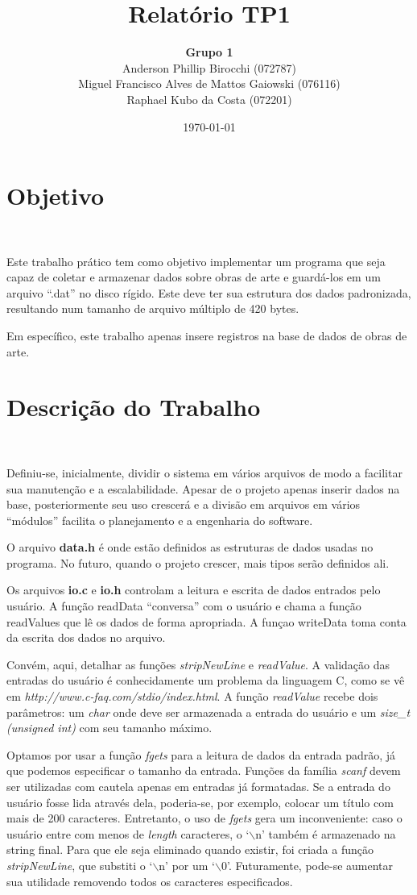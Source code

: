 \documentclass{article}
\title{\textbf{Relatório TP1}}
\author{\textbf{Grupo 1} \\
  Anderson Phillip Birocchi (072787) \\
  Miguel Francisco Alves de Mattos Gaiowski (076116) \\
  Raphael Kubo da Costa (072201)}
\date{\today}
\begin{document}
\maketitle

\section*{Objetivo}\

Este trabalho prático tem como objetivo implementar um programa que seja capaz de coletar e armazenar dados sobre obras de arte e guardá-los em um arquivo ``.dat'' no disco rígido. Este deve ter sua estrutura dos dados padronizada, resultando num tamanho de arquivo múltiplo de 420 bytes.

Em específico, este trabalho apenas insere registros na base de dados de obras de arte.

\section*{Descrição do Trabalho}\

Definiu-se, inicialmente, dividir o sistema em vários arquivos de modo a facilitar sua manutenção e a escalabilidade. Apesar de o projeto apenas inserir dados na base, posteriormente seu uso crescerá e a divisão em arquivos em vários ``módulos'' facilita o planejamento e a engenharia do software.

O arquivo \textbf{data.h} é onde estão definidos as estruturas de dados usadas no programa. No futuro, quando o projeto crescer, mais tipos serão definidos ali.

Os arquivos \textbf{io.c} e \textbf{io.h} controlam a leitura e escrita de dados entrados pelo usuário. A função readData ``conversa'' com o usuário e chama a função readValues que lê os dados de forma apropriada. A funçao writeData toma conta da escrita dos dados no arquivo.

Convém, aqui, detalhar as funções \textit{stripNewLine} e \textit{readValue}. A validação das entradas do usuário é conhecidamente um problema da linguagem C, como se vê em \textit{http://www.c-faq.com/stdio/index.html}. A função \textit{readValue} recebe dois parâmetros: um \textit{char} onde deve ser armazenada a entrada do usuário e um \textit{size\_t (unsigned int)} com seu tamanho máximo.

Optamos por usar a função \textit{fgets} para a leitura de dados da entrada padrão, já que podemos especificar o tamanho da entrada. Funções da família \textit{scanf} devem ser utilizadas com cautela apenas em entradas já formatadas. Se a entrada do usuário fosse lida através dela, poderia-se, por exemplo, colocar um título com mais de 200 caracteres. Entretanto, o uso de \textit{fgets} gera um inconveniente: caso o usuário entre com menos de \textit{length} caracteres, o `$\backslash$n' também é armazenado na string final. Para que ele seja eliminado quando existir, foi criada a função \textit{stripNewLine}, que substiti o `$\backslash$n' por um `$\backslash$0'. Futuramente, pode-se aumentar sua utilidade removendo todos os caracteres especificados.
\end{document}
